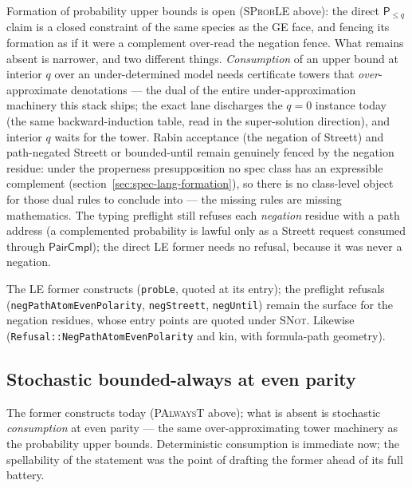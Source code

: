 Formation of probability upper bounds is open (\textsc{SProbLE}
above): the direct $\mathsf{P}_{\le q}$ claim is a closed constraint
of the same species as the GE face, and fencing its formation as if
it were a complement over-read the negation fence. What remains
absent is narrower, and two different things.
\emph{Consumption} of an upper bound at interior $q$ over an
under-determined model needs certificate towers that
\emph{over}-approximate denotations --- the dual of the entire
under-approximation machinery this stack ships; the exact lane
discharges the $q = 0$ instance today (the same backward-induction
table, read in the super-solution direction), and interior $q$ waits
for the tower. Rabin acceptance (the negation of Streett) and
path-negated Streett or bounded-until remain genuinely fenced by the
negation residue: under the properness presupposition no spec class
has an expressible complement
(section~\ref{sec:spec-lang-formation}), so there is no class-level
object for those dual rules to conclude into --- the missing rules
are missing mathematics. The typing preflight still refuses each
\emph{negation} residue with a path address (a complemented
probability is lawful only as a Streett request consumed through
$\mathsf{PairCmpl}$); the direct LE former needs no refusal, because
it was never a negation.

The LE former constructs (\texttt{probLe}, quoted at its entry); the
preflight refusals (\texttt{negPathAtomEvenPolarity},
\texttt{negStreett}, \texttt{negUntil}) remain the surface for the
negation residues, whose entry points are quoted under \textsc{SNot}.
Likewise (\texttt{Refusal::NegPathAtomEvenPolarity} and kin, with
formula-path geometry).

\subsection{Stochastic bounded-always at even parity}
\label{sec:spec-lang-falwaysstoch}


The former constructs today (\textsc{PAlwaysT} above); what is absent
is stochastic \emph{consumption} at even parity --- the same
over-approximating tower machinery as the probability upper bounds.
Deterministic consumption is immediate now; the spellability of the
statement was the point of drafting the former ahead of its full
battery.

